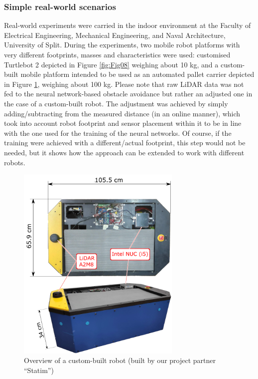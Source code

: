\subsubsection{Simple real-world scenarios} \label{sec:MediationReal}
Real-world experiments were carried in the indoor environment at the Faculty of Electrical Engineering, Mechanical Engineering, and Naval Architecture, University of Split. During the experiments, two mobile robot platforms with very different footprints, masses and characteristics were used: customised Turtlebot 2 depicted in Figure \ref{fig:Fig08} weighing about 10 kg, and a custom-built mobile platform intended to be used as an automated pallet carrier depicted in Figure \ref{Fig:paletarCombo}, weighing about 100 kg. Please note that raw LiDAR data was not fed to the neural network-based obstacle avoidance but rather an adjusted one in the case of a custom-built robot. The adjustment was achieved by simply adding/subtracting from the measured distance (in an online manner), which took into account robot footprint and sensor placement within it to be in line with the one used for the training of the neural networks. Of course, if the training were achieved with a different/actual footprint, this step would not be needed, but it shows how the approach can be extended to work with different robots.

\begin{figure}
\centering
\includegraphics[width=0.7\textwidth]{slike/paletar.png}
\caption[Overview of a custom-built robot]{Overview of a custom-built robot (built by our project partner ``Statim'')}
\label{Fig:paletarCombo}
\end{figure}

